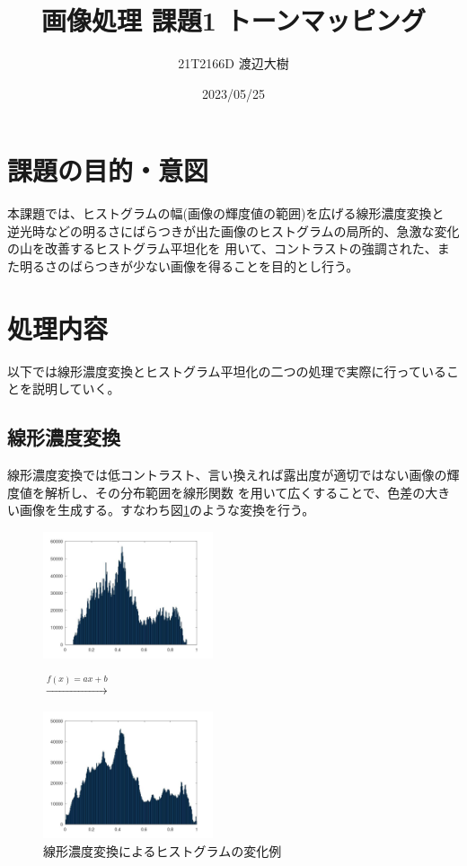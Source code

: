 \documentclass[a4paper,11pt,dvipdfmx]{jsarticle}
\begin{document}
\title{画像処理 課題1 トーンマッピング}
\author{21T2166D 渡辺大樹}
\date{2023/05/25}
\maketitle

\section{課題の目的・意図}
本課題では、ヒストグラムの幅(画像の輝度値の範囲)を広げる線形濃度変換と
逆光時などの明るさにばらつきが出た画像のヒストグラムの局所的、急激な変化の山を改善するヒストグラム平坦化を
用いて、コントラストの強調された、また明るさのばらつきが少ない画像を得ることを目的とし行う。

\section{処理内容}
以下では線形濃度変換とヒストグラム平坦化の二つの処理で実際に行っていることを説明していく。
\subsection{線形濃度変換}
線形濃度変換では低コントラスト、言い換えれば露出度が適切ではない画像の輝度値を解析し、その分布範囲を線形関数
を用いて広くすることで、色差の大きい画像を生成する。すなわち図\ref{hist_1}のような変換を行う。
\begin{figure}[htbp]
    \centering
    \begin{minipage}{0.4\hsize}
        \centering
        \includegraphics[width=50mm]{./img/linear_ex.jpg}
    \end{minipage}
    \begin{minipage}{0.1\hsize}
        \centering
        \begin{math}
                \overset{f(x)=ax+b}{\to}
        \end{math}
    \end{minipage}
    \begin{minipage}{0.4\hsize}
        \centering
        \includegraphics[width=50mm]{./img/linear_ex1.jpg}
    \end{minipage}
    \caption{線形濃度変換によるヒストグラムの変化例}
    \label{hist_1}
\end{figure}
\end{document}
